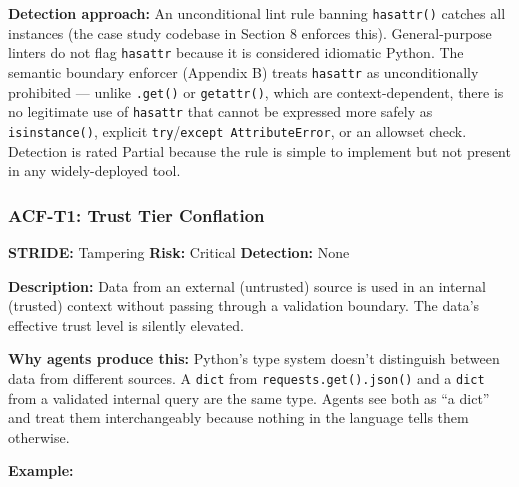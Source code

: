 \documentclass[a4paper,11pt]{report}
\begin{document}
\textbf{Detection approach:} An unconditional lint rule banning
\texttt{hasattr()} catches all instances (the case study codebase in
Section 8 enforces this). General-purpose linters do not flag
\texttt{hasattr} because it is considered idiomatic Python. The semantic
boundary enforcer (Appendix B) treats \texttt{hasattr} as
unconditionally prohibited --- unlike \texttt{.get()} or
\texttt{getattr()}, which are context-dependent, there is no legitimate
use of \texttt{hasattr} that cannot be expressed more safely as
\texttt{isinstance()}, explicit
\texttt{try}/\texttt{except\ AttributeError}, or an allowset check.
Detection is rated Partial because the rule is simple to implement but
not present in any widely-deployed tool.

\hypertarget{acf-t1-trust-tier-conflation}{%
\subsubsection{ACF-T1: Trust Tier
Conflation}\label{acf-t1-trust-tier-conflation}}

\textbf{STRIDE:} Tampering \textbar{} \textbf{Risk:} Critical \textbar{}
\textbf{Detection:} None

\textbf{Description:} Data from an external (untrusted) source is used
in an internal (trusted) context without passing through a validation
boundary. The data's effective trust level is silently elevated.

\textbf{Why agents produce this:} Python's type system doesn't
distinguish between data from different sources. A \texttt{dict} from
\texttt{requests.get().json()} and a \texttt{dict} from a validated
internal query are the same type. Agents see both as ``a dict'' and
treat them interchangeably because nothing in the language tells them
otherwise.

\textbf{Example:}
\end{document}
